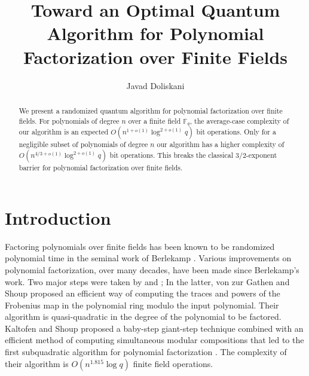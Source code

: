 \documentclass{article}
\title{Toward an Optimal Quantum Algorithm for Polynomial Factorization over Finite Fields}
\author[1]{Javad Doliskani}
\affil[1]{\small Institute for Quantum Computing, University of Waterloo}
\date{}
\theoremstyle{plain}
\theoremstyle{definition}
\def\F{\ensuremath{\mathbb{F}}}
\begin{document}
\maketitle

\begin{abstract}
	We present a randomized quantum algorithm for polynomial factorization over finite fields. For 
	polynomials of degree $n$ over a finite field $\F_q$, the average-case complexity of our 
	algorithm is an expected $O(n^{1 + o(1)} \log^{2 + o(1)}q)$ bit operations. Only for a 
	negligible subset of polynomials of degree $n$ our algorithm has a higher complexity of $O(n^{4 
	/ 3 + o(1)} \log^{2 + o(1)}q)$ bit operations. This breaks the classical $3/2$-exponent 
	barrier for polynomial factorization over finite fields.
\end{abstract}




\section{Introduction}
\label{sec:intro}

Factoring polynomials over finite fields has been known to be randomized polynomial time in the 
seminal work of Berlekamp \cite{Berlekamp70}. Various improvements on polynomial factorization, 
over many decades, have been made since Berlekamp's work. Two major steps were taken by 
\cite{cantor1981new} and \cite{von1992computing}; In the latter, von zur Gathen and Shoup proposed 
an efficient way of computing the traces and powers of the Frobenius map in the polynomial ring 
modulo the input polynomial. Their algorithm is quasi-quadratic in the degree of the polynomial to 
be factored. Kaltofen and Shoup proposed a baby-step giant-step technique combined with an 
efficient method of computing simultaneous modular compositions that led to the first subquadratic 
algorithm for polynomial factorization \cite{KaSh98}. The complexity of their algorithm is 
$O(n^{1.815}\log q)$ finite field operations. 
\end{document}
